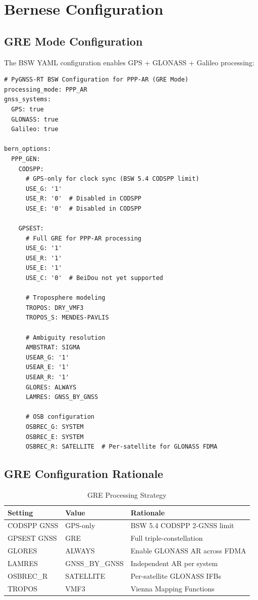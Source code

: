 \documentclass[11pt,a4paper,twoside]{report}
\begin{document}
\chapter{Bernese Configuration}

\section{GRE Mode Configuration}

The BSW YAML configuration enables GPS + GLONASS + Galileo processing:

\begin{lstlisting}[style=yamlstyle, caption={GRE Mode Configuration}, label={lst:gre-config}]
# PyGNSS-RT BSW Configuration for PPP-AR (GRE Mode)
processing_mode: PPP_AR
gnss_systems:
  GPS: true
  GLONASS: true
  Galileo: true

bern_options:
  PPP_GEN:
    CODSPP:
      # GPS-only for clock sync (BSW 5.4 CODSPP limit)
      USE_G: '1'
      USE_R: '0'  # Disabled in CODSPP
      USE_E: '0'  # Disabled in CODSPP

    GPSEST:
      # Full GRE for PPP-AR processing
      USE_G: '1'
      USE_R: '1'
      USE_E: '1'
      USE_C: '0'  # BeiDou not yet supported

      # Troposphere modeling
      TROPOS: DRY_VMF3
      TROPOS_S: MENDES-PAVLIS

      # Ambiguity resolution
      AMBSTRAT: SIGMA
      USEAR_G: '1'
      USEAR_E: '1'
      USEAR_R: '1'
      GLORES: ALWAYS
      LAMRES: GNSS_BY_GNSS

      # OSB configuration
      OSBREC_G: SYSTEM
      OSBREC_E: SYSTEM
      OSBREC_R: SATELLITE  # Per-satellite for GLONASS FDMA
\end{lstlisting}

\section{GRE Configuration Rationale}

\begin{table}[H]
\centering
\caption{GRE Processing Strategy}
\label{tab:gre-rationale}
\begin{tabular}{@{}llp{5cm}@{}}
\toprule
\textbf{Setting} & \textbf{Value} & \textbf{Rationale} \\
\midrule
CODSPP GNSS & GPS-only & BSW 5.4 CODSPP 2-GNSS limit \\
GPSEST GNSS & GRE & Full triple-constellation \\
GLORES & ALWAYS & Enable GLONASS AR across FDMA \\
LAMRES & GNSS\_BY\_GNSS & Independent AR per system \\
OSBREC\_R & SATELLITE & Per-satellite GLONASS IFBs \\
TROPOS & VMF3 & Vienna Mapping Functions \\
\bottomrule
\end{tabular}
\end{table}
\end{document}

